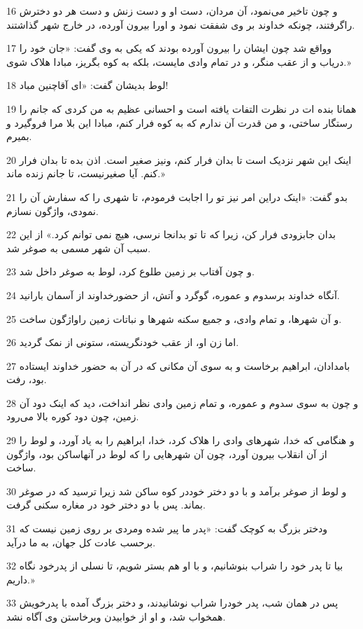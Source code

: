 \par 16 و چون تاخیر می‌نمود، آن مردان، دست او و دست زنش و دست هر دو دخترش راگرفتند، چونکه خداوند بر وی شفقت نمود و اورا بیرون آورده، در خارج شهر گذاشتند.
\par 17 وواقع شد چون ایشان را بیرون آورده بودند که یکی به وی گفت: «جان خود را دریاب و از عقب منگر، و در تمام وادی مایست، بلکه به کوه بگریز، مبادا هلاک شوی.»
\par 18 لوط بدیشان گفت: «ای آقاچنین مباد!
\par 19 همانا بنده ات در نظرت التفات یافته است و احسانی عظیم به من کردی که جانم را رستگار ساختی، و من قدرت آن ندارم که به کوه فرار کنم، مبادا این بلا مرا فرو‌گیرد و بمیرم.
\par 20 اینک این شهر نزدیک است تا بدان فرار کنم، ونیز صغیر است. اذن بده تا بدان فرار کنم. آیا صغیرنیست، تا جانم زنده ماند.»
\par 21 بدو گفت: «اینک دراین امر نیز تو را اجابت فرمودم، تا شهری را که سفارش آن را نمودی، واژگون نسازم.
\par 22 بدان جابزودی فرار کن، زیرا که تا تو بدانجا نرسی، هیچ نمی توانم کرد.» از این سبب آن شهر مسمی به صوغر شد.
\par 23 و چون آفتاب بر زمین طلوع کرد، لوط به صوغر داخل شد.
\par 24 آنگاه خداوند برسدوم و عموره، گوگرد و آتش، از حضورخداوند از آسمان بارانید.
\par 25 و آن شهرها، و تمام وادی، و جمیع سکنه شهرها و نباتات زمین راواژگون ساخت.
\par 26 اما زن او، از عقب خودنگریسته، ستونی از نمک گردید.
\par 27 بامدادان، ابراهیم برخاست و به سوی آن مکانی که در آن به حضور خداوند ایستاده بود، رفت.
\par 28 و چون به سوی سدوم و عموره، و تمام زمین وادی نظر انداخت، دید که اینک دود آن زمین، چون دود کوره بالا می‌رود.
\par 29 و هنگامی که خدا، شهرهای وادی را هلاک کرد، خدا، ابراهیم را به یاد آورد، و لوط را از آن انقلاب بیرون آورد، چون آن شهرهایی را که لوط در آنهاساکن بود، واژگون ساخت.
\par 30 و لوط از صوغر برآمد و با دو دختر خوددر کوه ساکن شد زیرا ترسید که در صوغر بماند. پس با دو دختر خود در مغاره سکنی گرفت. 
\par 31 ودختر بزرگ به کوچک گفت: «پدر ما پیر شده ومردی بر روی زمین نیست که برحسب عادت کل جهان، به ما در‌آید.
\par 32 بیا تا پدر خود را شراب بنوشانیم، و با او هم بستر شویم، تا نسلی از پدرخود نگاه داریم.»
\par 33 پس در همان شب، پدر خودرا شراب نوشانیدند، و دختر بزرگ آمده با پدرخویش همخواب شد، و او از خوابیدن وبرخاستن وی آگاه نشد.

